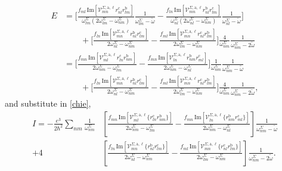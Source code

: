 \begin{align*}
E &=  
\Bigg[
  \frac{f_{ml}\,\mathrm{Im}\left[\mathcal{V}^{\Sigma,\text{a},\ell}_{mn}
        r^{\text{c}}_{nl}
        r^{\text{b}}_{lm}\right]}
        {\omega^\Sigma_{lm}(2\omega^\Sigma_{lm}-\omega^\Sigma_{nm})}
\frac{1}{\omega^\Sigma_{lm}-\tilde\omega}
 -\frac{f_{ln}\,\mathrm{Im}\left[\mathcal{V}^{\Sigma,\text{a},\ell}_{mn}
        r^{\text{b}}_{nl}
        r^{\text{c}}_{lm}\right]}
        {\omega^\Sigma_{nl}(2\omega^\Sigma_{nl}-\omega^\Sigma_{nm})}
\frac{1}{\omega^\Sigma_{nl}-\tilde\omega}
\Bigg]\nonumber\\
&\qquad+
\Bigg[
  \frac{f_{ln}\,\mathrm{Im}\left[\mathcal{V}^{\Sigma,\text{a},\ell}_{mn}
        r^{\text{b}}_{nl}
        r^{\text{c}}_{lm}\right]}
        {2\omega^\Sigma_{nl}-\omega^\Sigma_{nm}}
 -\frac{f_{ml}\,\mathrm{Im}\left[\mathcal{V}^{\Sigma,\text{a},\ell}_{mn}
        r^{\text{c}}_{nl}
        r^{\text{b}}_{lm}\right]}
        {2\omega^\Sigma_{lm}-\omega^\Sigma_{nm}}
\Bigg]\frac{4}{\omega^\Sigma_{nm}}\frac{1}{\omega^\Sigma_{nm}-2\tilde\omega}
\nonumber\\
&=  
\Bigg[
  \frac{f_{mn}\,\mathrm{Im}\left[\mathcal{V}^{\Sigma,\text{a},\ell}_{ml}
        r^{\text{c}}_{ln}
        r^{\text{b}}_{nm}\right]}
        {2\omega^\Sigma_{nm}-\omega^\Sigma_{lm}}
 -\frac{f_{mn}\,\mathrm{Im}\left[\mathcal{V}^{\Sigma,\text{a},\ell}_{ln}
        r^{\text{b}}_{nm}
        r^{\text{c}}_{ml}\right]}
        {2\omega^\Sigma_{nm}-\omega^\Sigma_{nl}}
\Bigg]\frac{1}{\omega^\Sigma_{nm}}\frac{1}{\omega^\Sigma_{nm}-\tilde\omega}
\nonumber\\
&\qquad+
\Bigg[
  \frac{f_{ln}\,\mathrm{Im}\left[\mathcal{V}^{\Sigma,\text{a},\ell}_{mn}
        r^{\text{b}}_{nl}
        r^{\text{c}}_{lm}\right]}
        {2\omega^\Sigma_{nl}-\omega^\Sigma_{nm}}
 -\frac{f_{ml}\,\mathrm{Im}\left[\mathcal{V}^{\Sigma,\text{a},\ell}_{mn}
        r^{\text{c}}_{nl}
        r^{\text{b}}_{lm}\right]}
        {2\omega^\Sigma_{lm}-\omega^\Sigma_{nm}}
\Bigg]\frac{4}{\omega^\Sigma_{nm}}\frac{1}{\omega^\Sigma_{nm}-2\tilde\omega},
\end{align*}
and substitute in \eqref{chie},
\begin{align*}
I = -\frac{e^3}{2\hbar^2}\sum_{nm}\frac{1}{\omega^\Sigma_{nm}}
&\left[
  \frac{f_{mn}\,\mathrm{Im}\left[\mathcal{V}^{\Sigma,\text{a},\ell}_{ml}
        \{r^{\text{c}}_{ln}
        r^{\text{b}}_{nm}\}\right]}
        {2\omega^\Sigma_{nm}-\omega^\Sigma_{lm}}
 -\frac{f_{mn}\,\mathrm{Im}\left[\mathcal{V}^{\Sigma,\text{a},\ell}_{ln}
        \{r^{\text{b}}_{nm}
        r^{\text{c}}_{ml}\}\right]}
        {2\omega^\Sigma_{nm}-\omega^\Sigma_{nl}}
\right]\frac{1}{\omega^\Sigma_{nm}-\tilde\omega}\nonumber\\
+
4&\left[
  \frac{f_{ln}\,\mathrm{Im}\left[\mathcal{V}^{\Sigma,\text{a},\ell}_{mn}
        \{r^{\text{b}}_{nl}
        r^{\text{c}}_{lm}\}\right]}
        {2\omega^\Sigma_{nl}-\omega^\Sigma_{nm}}
 -\frac{f_{ml}\,\mathrm{Im}\left[\mathcal{V}^{\Sigma,\text{a},\ell}_{mn}
        \{r^{\text{c}}_{nl}
        r^{\text{b}}_{lm}\}\right]}
        {2\omega^\Sigma_{lm}-\omega^\Sigma_{nm}}
\right]\frac{1}{\omega^\Sigma_{nm}-2\tilde\omega}.
\end{align*}
